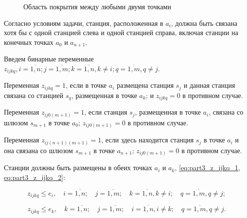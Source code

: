 \begin{figure}[ht]
  \caption{Область покрытия между любыми двумя точками}\label{fig:part3_total_coverage_between_points}
\end{figure}

Согласно условиям задачи, станция, расположенная в $ a_i $, должна быть связана хотя бы с одной станцией слева и одной станцией справа, включая станции на конечных точках $ a_0 $ и $a_{n + 1}$. 

Введем бинарные переменные $z_{ijkq}, i = \overline{1,n}; j= \overline{1,m}; k=\overline{1,n},  k \neq i; q= \overline{1,m}, q \neq j$.

Переменная $ z_ {ijkq} = 1$, если в точке $ a_i $ размещена станция $ s_j $ и данная станция связана со станцией $ s_q $, размещенная в точке $ a_k $; и $ z_ {ijkq} = 0 $ в противном случае.

Переменная $ z_{ij0(m + 1)} = 1$, если станция $ s_j $, размещенная в точке $ a_i $, связана со шлюзом $ s_{m + 1} $ в точке $ a_0 $; $ z_{ij0 (m + 1)} = 0 $ в противном случае.
 
Переменная $ z_{ij(n + 1)(m + 1)} = 1 $, если здесь находится станция $ s_j $ в точке $ a_i $ и она связана со шлюзом $ s_{m + 1} $ в точке $ a_{n + 1} $; $ z_{ij0(m + 1)} = 0 $  в противном случае.

Станции должны быть размещены в обеих точках $ a_i $ и $ a_k $, \cref{eq:part3_z_ijkq_1, eq:part3_z_ijkq_2}:

\begin{equation}
  \label{eq:part3_z_ijkq_1}
  z_{ijkq} \leq e_i , \quad i = \overline{1, n}; \quad j = \overline{1, m}; \quad k = \overline{1,n}, k \neq i; \quad q = \overline{1,m}, q \neq j;
\end{equation}


\begin{equation}
  \label{eq:part3_z_ijkq_2}
  z_{ijkq} \leq e_k , \quad k = \overline{1, n}; \quad j = \overline{1, m}; \quad i = \overline{1,n}, i \neq k; \quad q = \overline{1,m}, q \neq j.
\end{equation}



